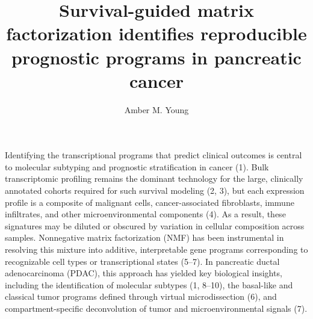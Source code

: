 \documentclass[9pt,twocolumn,twoside,]{pnas-new}
\title{Survival-guided matrix factorization identifies reproducible
prognostic programs in pancreatic cancer}
\author[a,1]{Amber M. Young}
\affil[a]{Department of Biostatistics, University of North Carolina at
Chapel Hill, Chapel Hill, NC 27599, USA}
\begin{document}
\verticaladjustment{-2pt}



\maketitle
\thispagestyle{firststyle}



Identifying the transcriptional programs that predict clinical outcomes
is central to molecular subtyping and prognostic stratification in
cancer (1). Bulk transcriptomic profiling remains the dominant
technology for the large, clinically annotated cohorts required for such
survival modeling (2, 3), but each expression profile is a composite of
malignant cells, cancer-associated fibroblasts, immune infiltrates, and
other microenvironmental components (4). As a result, these signatures
may be diluted or obscured by variation in cellular composition across
samples. Nonnegative matrix factorization (NMF) has been instrumental in
resolving this mixture into additive, interpretable gene programs
corresponding to recognizable cell types or transcriptional states
(5--7). In pancreatic ductal adenocarcinoma (PDAC), this approach has
yielded key biological insights, including the identification of
molecular subtypes (1, 8--10), the basal-like and classical tumor
programs defined through virtual microdissection (6), and
compartment-specific deconvolution of tumor and microenvironmental
signals (7).
\end{document}
